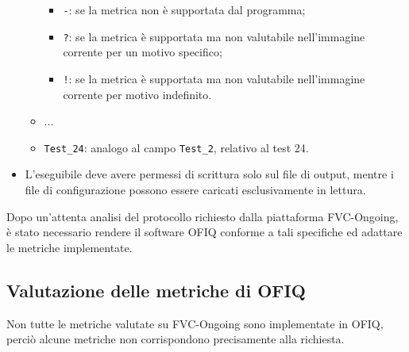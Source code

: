 \documentclass[12pt,a4paper,openright,twoside]{book}
\begin{document}
\begin{itemize}
\begin{itemize}
        \begin{itemize}
            \item \texttt{-}: se la metrica non è supportata dal programma;
            \item \texttt{?}: se la metrica è supportata ma non valutabile nell'immagine corrente per un motivo specifico;
            \item \texttt{!}: se la metrica è supportata ma non valutabile nell'immagine corrente per motivo indefinito.
        \end{itemize}
        \item ...
        \item \texttt{Test\_24}: analogo al campo \texttt{Test\_2}, relativo al test 24.
    \end{itemize}
    \item L'eseguibile deve avere permessi di scrittura solo sul file di output, mentre i file di configurazione possono essere caricati esclusivamente in lettura.
\end{itemize}

Dopo un'attenta analisi del protocollo richiesto dalla piattaforma FVC-Ongoing, è stato necessario rendere il software OFIQ conforme a tali specifiche ed adattare le metriche implementate.

\subsection{Valutazione delle metriche di OFIQ}
Non tutte le metriche valutate su FVC-Ongoing sono implementate in OFIQ, perciò alcune metriche non corrispondono precisamente alla richiesta.
\medskip
\end{document}
